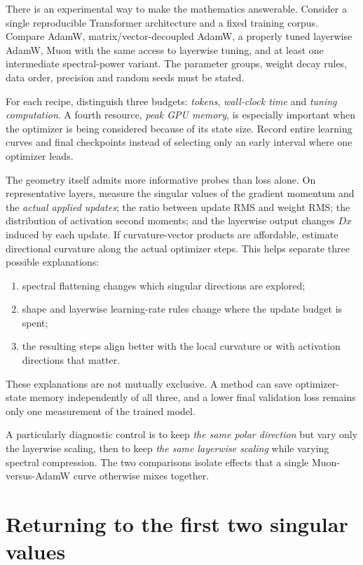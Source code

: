 There is an experimental way to make the mathematics answerable.  Consider a single reproducible Transformer architecture and a fixed training corpus.  Compare AdamW, matrix/vector-decoupled AdamW, a properly tuned layerwise AdamW, Muon with the same access to layerwise tuning, and at least one intermediate spectral-power variant.  The parameter groups, weight decay rules, data order, precision and random seeds must be stated.

For each recipe, distinguish three budgets: \emph{tokens}, \emph{wall-clock time} and \emph{tuning computation}.  A fourth resource, \emph{peak GPU memory}, is especially important when the optimizer is being considered because of its state size.  Record entire learning curves and final checkpoints instead of selecting only an early interval where one optimizer leads.

The geometry itself admits more informative probes than loss alone.  On representative layers, measure the singular values of the gradient momentum and the \emph{actual applied updates}; the ratio between update RMS and weight RMS; the distribution of activation second moments; and the layerwise output changes \(Dx\) induced by each update.  If curvature-vector products are affordable, estimate directional curvature along the actual optimizer steps.  This helps separate three possible explanations:
\begin{enumerate}
 \item spectral flattening changes which singular directions are explored;
 \item shape and layerwise learning-rate rules change where the update budget is spent;
 \item the resulting steps align better with the local curvature or with activation directions that matter.
\end{enumerate}
These explanations are not mutually exclusive.  A method can save optimizer-state memory independently of all three, and a lower final validation loss remains only one measurement of the trained model.

A particularly diagnostic control is to keep \emph{the same polar direction} but vary only the layerwise scaling, then to keep \emph{the same layerwise scaling} while varying spectral compression.  The two comparisons isolate effects that a single Muon-versus-AdamW curve otherwise mixes together.

\section{Returning to the first two singular values}

